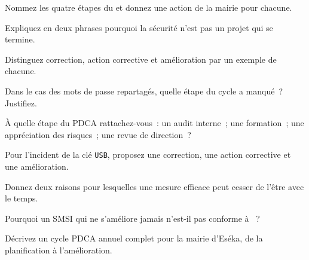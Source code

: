\bigskip

\begin{boxexo}[title={\ding{45}\quad Exercice~3.1. Les quatre étapes \niveaubase}]
Nommez les quatre étapes du  et donnez une action de la mairie pour
chacune.
\end{boxexo}

\begin{boxexo}[title={\ding{45}\quad Exercice~3.2. Cycle ou projet \niveaubase}]
Expliquez en deux phrases pourquoi la sécurité n'est pas un projet qui se
termine.
\end{boxexo}

\begin{boxexo}[title={\ding{45}\quad Exercice~3.3. Trois mots \niveaubase}]
Distinguez correction, action corrective et amélioration par un exemple de
chacune.
\end{boxexo}

\begin{boxexo}[title={\ding{45}\quad Exercice~3.4. L'étape manquante \niveaumoyen}]
Dans le cas des mots de passe repartagés, quelle étape du cycle a manqué~?
Justifiez.
\end{boxexo}

\begin{boxexo}[title={\ding{45}\quad Exercice~3.5. Rattacher au cycle \niveaumoyen}]
À quelle étape du PDCA rattachez-vous~: un audit interne~; une formation~; une
appréciation des risques~; une revue de direction~?
\end{boxexo}

\begin{boxexo}[title={\ding{45}\quad Exercice~3.6. De la correction à la cause \niveaumoyen}]
Pour l'incident de la clé \texttt{USB}, proposez une correction, une action
corrective et une amélioration.
\end{boxexo}

\begin{boxexo}[title={\ding{45}\quad Exercice~3.7. Dérive \niveaumoyen}]
Donnez deux raisons pour lesquelles une mesure efficace peut cesser de l'être
avec le temps.
\end{boxexo}

\begin{boxexo}[title={\ding{45}\quad Exercice~3.8. Exigence \niveaumoyen}]
Pourquoi un SMSI qui ne s'améliore jamais n'est-il pas conforme à
~?
\end{boxexo}

\begin{boxexo}[title={\ding{45}\quad Exercice~3.9. Planifier un tour \niveauexpert}]
Décrivez un cycle PDCA annuel complet pour la mairie d'Eséka, de la
planification à l'amélioration.
\end{boxexo}

